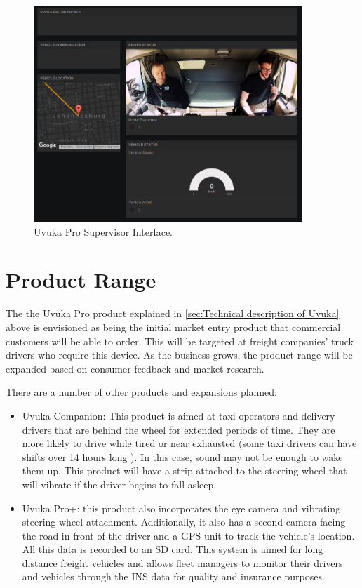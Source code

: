 \begin{figure}[H]
\centering
\includegraphics[width=0.9\textwidth]{images/uvuka-interface.png}
\vskip10pt
\caption[Uvuka Interface]{Uvuka Pro Supervisor Interface.}
\label{fig:UvukaInterface}
\end{figure}

\newpage
\section{Product Range}
The the Uvuka Pro product explained in \cref{sec:Technical description of Uvuka} above is envisioned as being the initial market entry product that commercial customers will be able to order. This will be targeted at freight companies' truck drivers who require this device. As the business grows, the product range will be expanded based on consumer feedback and market research.

There are a number of other products and expansions planned:
\begin{itemize}
\item Uvuka Companion: This product is aimed at taxi operators and delivery drivers that are behind the wheel for extended periods of time. They are more likely to drive while tired or near exhausted (some taxi drivers can have shifts over 14 hours long \cite{taxiDriverHours}). In this case, sound may not be enough to wake them up. This product will have a strip attached to the steering wheel that will vibrate if the driver begins to fall asleep.
\item Uvuka Pro+: this product also incorporates the eye camera and vibrating steering wheel attachment. Additionally, it also has a second camera facing the road in front of the driver and a GPS unit to track the vehicle's location. All this data is recorded to an SD card. This system is aimed for long distance freight vehicles and allows fleet managers to monitor their drivers and vehicles through the INS data for quality and insurance purposes.
\end{itemize}

